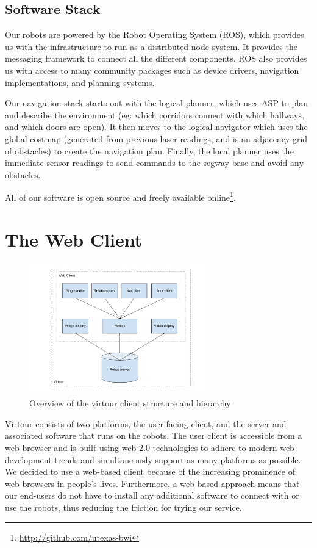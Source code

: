 \documentclass[
  oneside,
  11pt, a4paper,
  footinclude=true,
  headinclude=true,
  cleardoublepage=empty
]{article}
\begin{document}
\subsection{Software Stack}

Our robots are powered by the Robot Operating System (ROS), which provides us
with the infrastructure to run as a distributed node system. It provides the
messaging framework to connect all the different components. ROS also provides
us with access to many community packages such as device drivers, navigation
implementations, and planning systems.

Our navigation stack starts out with the logical planner, which uses ASP to
plan and describe the environment (eg: which corridors connect with which
hallways, and which doors are open). It then moves to the logical navigator
which uses the global costmap (generated from previous laser readings, and is
an adjacency grid of obstacles) to create the navigation plan.  Finally, the
local planner uses the immediate sensor readings to send commands to the segway
base and avoid any obstacles.

All of our software is open source and freely available
online\footnote{\url{http://github.com/utexas-bwi}}.

\section{The Web Client}

\begin{figure}
\centering
\includegraphics[width=3in]{virtour_client}
\caption{Overview of the virtour client structure and hierarchy}
\end{figure}

Virtour consists of two platforms, the user facing client, and the server and
associated software that runs on the robots. The user client is accessible from
a web browser and is built using web 2.0 technologies to adhere to modern web
development trends and simultaneously support as many platforms as possible. We
decided to use a web-based client because of the increasing prominence of web
browsers in people's lives. Furthermore, a web based approach means that our
end-users do not have to install any additional software to connect with or use
the robots, thus reducing the friction for trying our service.
\end{document}

